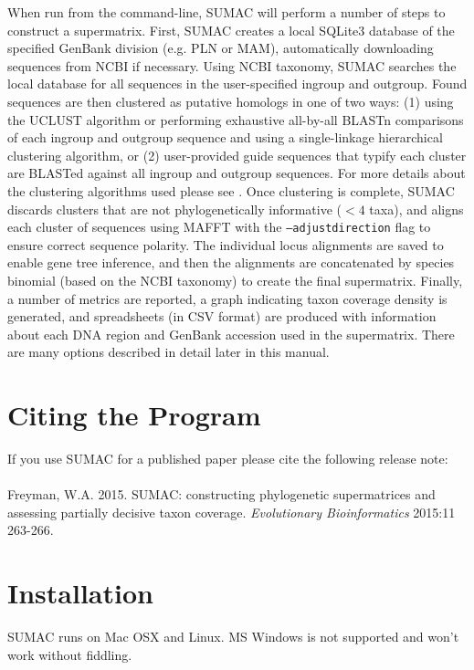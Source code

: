 \documentclass[10pt]{report}
\begin{document}
When run from the command-line, SUMAC will perform a number of steps to construct
a supermatrix.
First, SUMAC creates a local SQLite3 \citep{sqlite} database of the specified GenBank division (e.g. PLN or MAM),
automatically downloading sequences from NCBI if necessary.
Using NCBI taxonomy, SUMAC searches the local database for all sequences in the user-specified ingroup
and outgroup.
Found sequences are then clustered as putative homologs in one of two ways:
(1) using the UCLUST \citep{edgar2010search} algorithm or performing exhaustive all-by-all BLASTn \citep{blast} comparisons of each ingroup and outgroup sequence
and using a single-linkage hierarchical clustering algorithm, or
(2) user-provided guide sequences that typify each cluster are BLASTed against all ingroup and outgroup sequences.
For more details about the clustering algorithms used please see \citet{sumac}.
Once clustering is complete, SUMAC discards clusters that are not phylogenetically informative ($< 4$ taxa),
and aligns each cluster of sequences using MAFFT \citep{katoh2002mafft} with the \texttt{--adjustdirection} flag
to ensure correct sequence polarity.
The individual locus alignments are saved to enable gene tree inference,
and then the alignments are concatenated by species binomial (based on the NCBI taxonomy)
to create the final supermatrix.
Finally, a number of metrics are reported,
a graph indicating taxon coverage density is generated, and spreadsheets (in CSV format)
are produced with information about each DNA region and GenBank accession used in
the supermatrix.
There are many options described in
detail later in this manual. 

\section{Citing the Program}

If you use SUMAC for a published paper please cite the following release note: \\
\\
Freyman, W.A. 2015. SUMAC: constructing phylogenetic supermatrices and assessing partially decisive taxon coverage.
\textit{Evolutionary Bioinformatics} 2015:11 263-266.

\section{Installation}

SUMAC runs on Mac OSX and Linux. MS Windows is not supported and won't work without fiddling.
\end{document}
